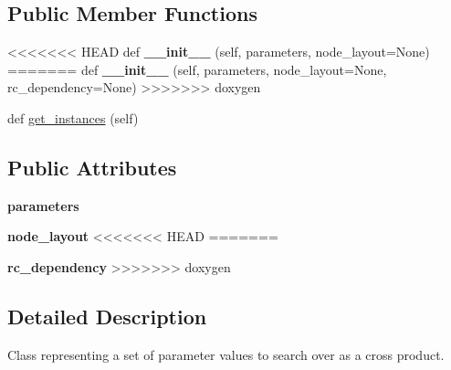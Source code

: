 \subsection*{Public Member Functions}
\begin{DoxyCompactItemize}
\item 
<<<<<<< HEAD
\mbox{\label{classcodar_1_1cheetah_1_1parameters_1_1_sweep_a3cdd4f58ac7324ac0f85c7f28f4bfee0}} 
def {\bfseries \+\_\+\+\_\+init\+\_\+\+\_\+} (self, parameters, node\+\_\+layout=None)
=======
\mbox{\label{classcodar_1_1cheetah_1_1parameters_1_1_sweep_a3ea717e50ebd6bf25d6c0548060d9b44}} 
def {\bfseries \+\_\+\+\_\+init\+\_\+\+\_\+} (self, parameters, node\+\_\+layout=None, rc\+\_\+dependency=None)
>>>>>>> doxygen
\item 
def \hyperlink{classcodar_1_1cheetah_1_1parameters_1_1_sweep_a25c111a2541f852d385d84baf51e9687}{get\+\_\+instances} (self)
\end{DoxyCompactItemize}
\subsection*{Public Attributes}
\begin{DoxyCompactItemize}
\item 
\mbox{\label{classcodar_1_1cheetah_1_1parameters_1_1_sweep_a5150062c13d48ec754188e4806958879}} 
{\bfseries parameters}
\item 
\mbox{\label{classcodar_1_1cheetah_1_1parameters_1_1_sweep_a2f9c8f2db28d801a5148904e85af06c6}} 
{\bfseries node\+\_\+layout}
<<<<<<< HEAD
=======
\item 
\mbox{\label{classcodar_1_1cheetah_1_1parameters_1_1_sweep_acaa6e4b27adef89d6383a075d31e761c}} 
{\bfseries rc\+\_\+dependency}
>>>>>>> doxygen
\end{DoxyCompactItemize}


\subsection{Detailed Description}
\begin{DoxyVerb}Class representing a set of parameter values to search over as
a cross product.
\end{DoxyVerb}
 

